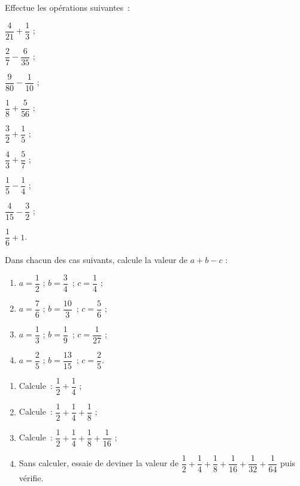 \begin{exercice}
Effectue les opérations suivantes : \\[0.1em]
\begin{colenumerate}{3}
 \item $\dfrac{4}{21} + \dfrac{1}{3}$ ;
 \vspace{0.2cm}
 \item $\dfrac{2}{7} - \dfrac{6}{35}$ ;
 \vspace{0.2cm}
 \item $\dfrac{9}{80} - \dfrac{1}{10}$ ;
 \item $\dfrac{1}{8} + \dfrac{5}{56}$ ;
 \item $\dfrac{3}{2} + \dfrac{1}{5}$ ;
 \item $\dfrac{4}{3} + \dfrac{5}{7}$ ;
 \item $\dfrac{1}{5} - \dfrac{1}{4}$ ;
 \item $\dfrac{4}{15} - \dfrac{3}{2}$ ;
  \item $\dfrac{1}{6} + 1$.
 \end{colenumerate}
\end{exercice}


\begin{exercice}
Dans chacun des cas suivants, calcule la valeur de $a + b -  c$ : 
\begin{enumerate}
 \item $a = \dfrac{1}{2}$ ; $b = \dfrac{3}{4}$ ; $c = \dfrac{1}{4}$ ;
  \vspace{0.2cm}
 \item $a = \dfrac{7}{6}$ ; $b = \dfrac{10}{3}$ ; $c = \dfrac{5}{6}$ ;
  \vspace{0.2cm}
 \item $a = \dfrac{1}{3}$ ; $b = \dfrac{1}{9}$ ; $c = \dfrac{1}{27}$ ;
  \vspace{0.2cm}
 \item $a = \dfrac{2}{5}$ ; $b = \dfrac{13}{15}$ ; $c = \dfrac{2}{5}$.
 \end{enumerate}
\end{exercice}


\begin{exercice}[Étonnant !]
\begin{enumerate}
 \item Calcule : $\dfrac{1}{2} + \dfrac{1}{4}$ ;
  \vspace{0.2cm}
 \item Calcule : $\dfrac{1}{2} + \dfrac{1}{4} + \dfrac{1}{8}$ ;
  \vspace{0.2cm}
 \item Calcule : $\dfrac{1}{2} + \dfrac{1}{4} + \dfrac{1}{8} + \dfrac{1}{16}$ ;
  \vspace{0.2cm}
 \item Sans calculer, essaie de deviner la valeur de $\dfrac{1}{2} + \dfrac{1}{4} + \dfrac{1}{8} + \dfrac{1}{16} + \dfrac{1}{32} + \dfrac{1}{64}$ puis vérifie.
 \end{enumerate}
\end{exercice}


